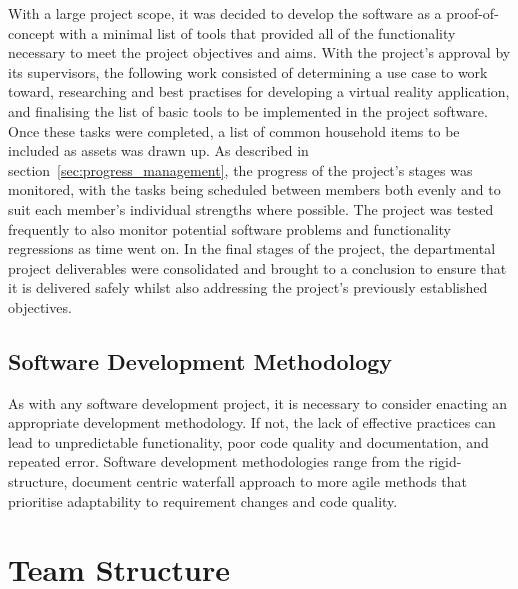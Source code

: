         With a large project scope, it was decided to develop the software as a proof-of-concept with a minimal list of tools that provided all of the functionality necessary to meet the project objectives and aims. With the project's approval by its supervisors, the following work consisted of determining a use case to work toward, researching  and best practises for developing a virtual reality application, and finalising the list of basic tools to be implemented in the project software. Once these tasks were completed, a list of common household items to be included as assets was drawn up. As described in section~\ref{sec:progress_management}, the progress of the project's stages was monitored, with the tasks being scheduled between members both evenly and to suit each member's individual strengths where possible. The project was tested frequently to also monitor potential software problems and functionality regressions as time went on. In the final stages of the project, the departmental project deliverables were consolidated and brought to a conclusion to ensure that it is delivered safely whilst also addressing the project's previously established objectives.

    \subsection{Software Development Methodology}
    
        As with any software development project, it is necessary to consider enacting an appropriate development methodology. If not, the lack of effective practices can lead to unpredictable functionality, poor code quality and documentation, and repeated error. Software development methodologies range from the rigid-structure, document centric waterfall approach to more agile methods that prioritise adaptability to requirement changes and code quality.
    

\section{Team Structure}
    
